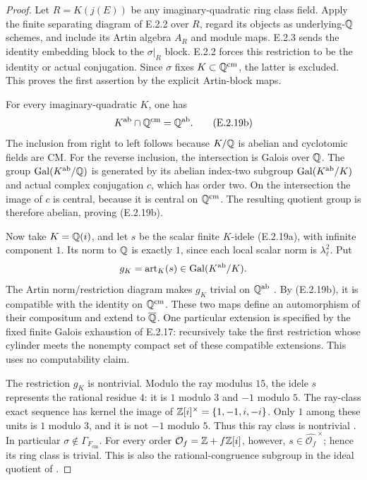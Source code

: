 \begin{proof}
Let \(R=K(j(E))\) be any imaginary-quadratic ring class field.
Apply the finite separating diagram of E.2.2 over \(R\), regard
its objects as underlying-\(\mathbb Q\) schemes, and include its
Artin algebra \(A_R\) and module maps. E.2.3 sends the identity
embedding block to the \(\sigma|_R\) block. E.2.2 forces this
restriction to be the identity or actual conjugation. Since
\(\sigma\) fixes \(K\subset\mathbb Q^{\mathrm{cm}}\), the latter is
excluded. This proves the first assertion by the explicit
Artin-block maps.

For every imaginary-quadratic \(K\), one has
\[
 K^{\mathrm{ab}}\cap\mathbb Q^{\mathrm{cm}}=\mathbb Q^{\mathrm{ab}}.
 \tag{E.2.19b}
\]
The inclusion from right to left follows because \(K/\mathbb Q\)
is abelian and cyclotomic fields are CM. For the reverse
inclusion, the intersection is Galois over \(\mathbb Q\).
The group \(\operatorname{Gal}(K^{\mathrm{ab}}/\mathbb Q)\) is generated by its
abelian index-two subgroup \(\operatorname{Gal}(K^{\mathrm{ab}}/K)\) and
actual complex conjugation \(c\), which has order two.
On the intersection the image of \(c\) is central, because
it is central on \(\mathbb Q^{\mathrm{cm}}\). The resulting quotient
group is therefore abelian, proving (E.2.19b).

Now take \(K=\mathbb Q(i)\), and let \(s\) be the scalar finite
\(K\)-idele (E.2.19a), with infinite component \(1\).
Its norm to \(\mathbb Q\) is exactly \(1\), since each local
scalar norm is \(\lambda_\ell^2\). Put
\[
 g_K=\operatorname{art}_K(s)\in\operatorname{Gal}(K^{\mathrm{ab}}/K).
\]
The Artin norm/restriction diagram makes \(g_K\) trivial
on \(\mathbb Q^{\mathrm{ab}}\)
\cite[Chapter V, Proposition 5.2 and its following diagram,
pp.~178--179]{GenMilneCFT2020}.
By (E.2.19b), it is compatible with the identity on
\(\mathbb Q^{\mathrm{cm}}\). These two maps define an automorphism
of their compositum and extend to \(\overline{\mathbb Q}\).
One particular extension is specified by the fixed finite
Galois exhaustion of E.2.17: recursively take the first
restriction whose cylinder meets the nonempty compact set
of these compatible extensions. This uses no computability
claim.

The restriction \(g_K\) is nontrivial. Modulo the ray
modulus \(15\), the idele \(s\) represents the rational
residue \(4\): it is \(1\) modulo \(3\) and \(-1\) modulo
\(5\). The ray-class exact sequence has kernel the image
of \(\mathbb Z[i]^\times=\{1,-1,i,-i\}\). Only \(1\) among these
units is \(1\) modulo \(3\), and it is not \(-1\) modulo
\(5\). Thus this ray class is nontrivial
\cite[Chapter V, Theorem 1.7 and proof,
pp.~150--151]{GenMilneCFT2020}.
In particular \(\sigma\notin\Gamma_{F_{\mathrm{cm}}}\).
For every order \(\mathcal O_f=\mathbb Z+f\mathbb Z[i]\), however,
\(s\in\widehat{\mathcal O_f}^{\,\times}\); hence its ring
class is trivial. This is also the rational-congruence
subgroup in the ideal quotient of
\cite[Theorem 9.18, pp.~190--192]{GenCox1989}.


\end{proof}
